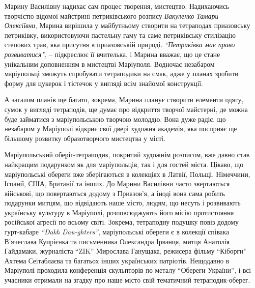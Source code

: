 Марину Василівну надихає сам процес творення, мистецтво. Надихаючись творчістю
відомої майстрині петриківського розпису \emph{Вакуленко Тамари Олексіївни}, Марина
вирішила у майбутньому створити на тетраподах приазовську петриківку,
використовуючи пастельну гаму та саме петриківську стилізацію степових трав,
яка присутня в приазовській природі. \emph{\enquote{Петриківка має право розвиватися}}, –
підкреслює її вчителька, і Марина вважає, що це стане унікальним доповненням в
мистецтві Маріуполя. Водночас незабаром маріупольці зможуть спробувати
тетраподики на смак, адже у планах зробити форму для цукерок і тістечок у
вигляді всім знайомої конструкції.


А загалом планів ще багато, зокрема, Марина
планує створити елементи одягу, сумок у вигляді тетраподів, ще думає про
відкриття творчої майстерні, де можна буде займатися з маріупольською творчою
молоддю. Вона дуже радіє, що незабаром у Маріуполі відкриє свої двері художня
академія, яка посприяє ще більшому розвитку образотворчого мистецтва у місті.


Маріупольський оберіг-тетраподик, покритий художнім розписом, вже давно став
найкращим подарунком як для маріупольців, так і для гостей міста. Цікаво, що
маріупольські обереги вже зберігаються в колекціях в Латвії, Польщі, Німеччини,
Іспанії, США, Британії та інших. До Марини Василівни часто звертаються
військові, що повертаються додому з Приазов'я, а іноді вона сама робить
подарунки митцям, що відвідають наше місто, людям, що несуть і розвивають
українську культуру в Маріуполі, розповсюджують його місію протистояння
російської агресії по всьому світі. Зокрема, тетраподну подушку повіз додому
гурт-кабаре \emph{\enquote{Dakh Dau\hyp{}ghters}}, маріупольські обереги є в колекції співака
В'ячеслава Купрієнка та письменника Олександра Ірванця, митця Анатолія
Гайдамаки, журналіста \enquote{ZIK} Мирослава Ганущака, режисера фільму \enquote{Кіборги}
Ахтема Сеітаблаєва та багатьох інших українських патріотів. Нещодавно в
Маріуполі проходила конференція скульпторів по металу \enquote{Обереги України}, і всі
учасники отримали на згадку про наше місто свій тематичний тетраподик-оберег.



